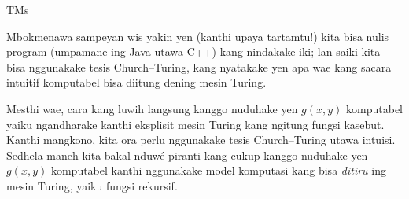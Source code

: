 \documentclass[../../../include/open-logic-section]{subfiles}
\begin{document}
\begin{tagblock}{TMs}
\begin{digress}
Mbokmenawa sampeyan wis yakin yen (kanthi
upaya tartamtu!) kita bisa nulis program
(umpamane ing Java utawa C++) kang nindakake
iki; lan saiki kita bisa nggunakake tesis
Church--Turing, kang nyatakake yen apa wae
kang sacara intuitif komputabel bisa diitung
dening mesin Turing.

Mesthi wae, cara kang luwih langsung kanggo
nuduhake yen $g(x,y)$ komputabel yaiku
ngandharake kanthi eksplisit mesin Turing
kang ngitung fungsi kasebut. Kanthi mangkono,
kita ora perlu nggunakake tesis Church--Turing
utawa intuisi. Sedhela maneh kita bakal
nduwé piranti kang cukup kanggo nuduhake
yen $g(x,y)$ komputabel kanthi nggunakake
model komputasi kang bisa \emph{ditiru}
ing mesin Turing, yaiku fungsi rekursif.
\end{digress}
\end{tagblock}
\end{document}
